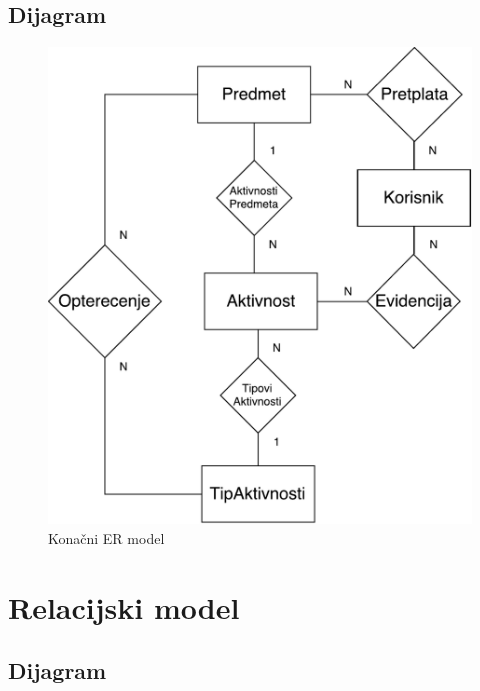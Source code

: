 \documentclass[times, utf8, zavrsni, numeric]{fer}
\begin{document}
\subsection{Dijagram}

\begin{figure}[H]
\centering
\includegraphics[scale=0.6]{img/er-model.pdf}
\caption{Konačni ER model}
\label{fig:er-model}
\end{figure}

\section{Relacijski model}
\subsection{Dijagram}
\end{document}
